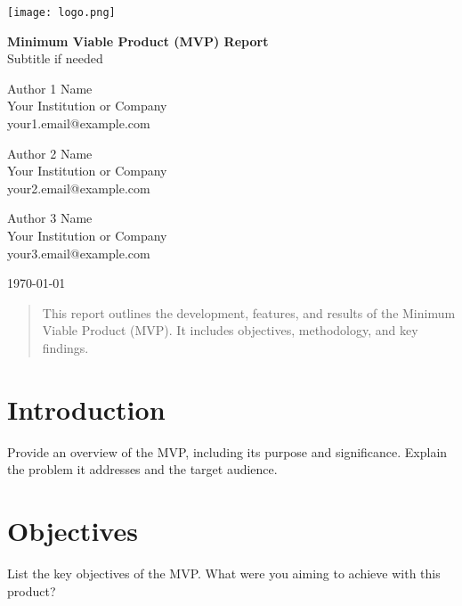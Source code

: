 \documentclass[12pt]{article}
\begin{document}
\begin{titlepage}
    \centering
    \texttt{[image: logo.png]} %
    \vspace{1cm}
    
    {\Huge \textbf{Minimum Viable Product (MVP) Report}}\\
    \vspace{0.5cm}
    {\Large Subtitle if needed}\\
    \vspace{1.5cm}
    
    {\Large Author 1 Name}\\
    {\large Your Institution or Company}\\
    {\large your1.email@example.com}\\
    \vspace{0.5cm}
    
    {\Large Author 2 Name}\\
    {\large Your Institution or Company}\\
    {\large your2.email@example.com}\\
    \vspace{0.5cm}
    
    {\Large Author 3 Name}\\
    {\large Your Institution or Company}\\
    {\large your3.email@example.com}\\
    \vfill
    
    {\large \today}
\end{titlepage}

\begin{abstract}
This report outlines the development, features, and results of the Minimum Viable Product (MVP). It includes objectives, methodology, and key findings.
\end{abstract}

\tableofcontents
\newpage

\section{Introduction}
Provide an overview of the MVP, including its purpose and significance. Explain the problem it addresses and the target audience.

\section{Objectives}
List the key objectives of the MVP. What were you aiming to achieve with this product?
\end{document}
